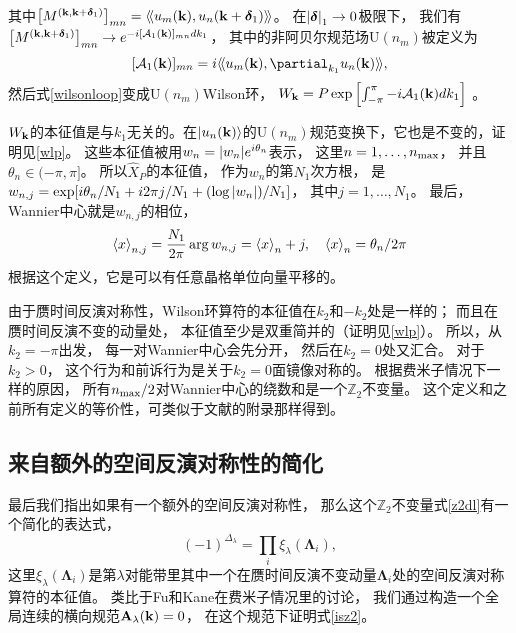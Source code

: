 其中$\bqty{M^{(\vb k,\vb k+\boldsymbol{\delta}_1)}}_{mn} =\krin{u_{m}(\vb k),u_n(\vb k+\boldsymbol{\delta}_1)}$。
在$\abs{\boldsymbol{\delta}}_1\rightarrow 0$极限下，
我们有$\bqty{M^{(\vb k,\vb k+\boldsymbol{\delta}_1)}}_{mn}\rightarrow e^{-i[\mathcal A_1(\vb k)]_{mn} dk_1}$，
其中的非阿贝尔规范场$\mathrm{U}(n_m)$被定义为
\begin{equation}\label{nonaa}
	[\mathcal A_{1}(\vb k)]_{mn}=i \krin{u_m(\vb k),\partial_{k_1} u_n(\vb k)},
\end{equation}
然后式\eqref{wilsonloop}变成$\mathrm{U}(n_m)$Wilson环，
$W_{\vb k}=P\exp\bqty{\int_{-\pi}^\pi -i\mathcal A_1(\vb k)dk_1}$ \cite{peskin1995an}。

$W_{\vb k}$的本征值是与$k_1$无关的。在$\ket{u_n(\vb k)}$的$\mathrm{U}(n_m)$规范变换下，它也是不变的，证明见\ref{wlp}。
这些本征值被用$w_n=\abs{w_n}e^{i\theta_n}$表示，
这里$n=1, \dots ,n_{\textnormal{max}}$，
并且$\theta_n\in (-\pi,\pi]$。
所以$\hat X_P$的本征值，
作为$w_n$的第$N_1$次方根，
是$w_{n,j}=\exp[i\theta_n/N_1+i 2\pi j/N_1 +(\log\abs{w_n})/N_1]$，
其中$j=1, \dots ,N_1$。
最后，
Wannier中心就是$w_{n,j}$的相位，
\begin{equation}
	\expval{x}_{n,j}=\frac{N_1}{2\pi}\arg w_{n,j}=\expval{x}_n+j,\quad \expval{x}_n=\theta_n/2\pi\nonumber
\end{equation}
根据这个定义，它是可以有任意晶格单位向量平移的。

由于赝时间反演对称性，Wilson环算符的本征值在$k_2$和$-k_2$处是一样的；
而且在赝时间反演不变的动量处，
本征值至少是双重简并的（证明见\ref{wlp}）。
所以，从$k_2=-\pi$出发，
每一对Wannier中心会先分开，
然后在$k_2=0$处又汇合。
对于$k_2>0$，
这个行为和前诉行为是关于$k_2=0$面镜像对称的。
根据费米子情况下一样的原因\cite{Yu2011}，
所有$n_{\textnormal{max}}/2$对Wannier中心的绕数和是一个$\mathbb Z_2$不变量。
这个定义和之前所有定义的等价性，可类似于文献\cite{Yu2011}的附录那样得到。


\subsection{来自额外的空间反演对称性的简化}
最后我们指出如果有一个额外的空间反演对称性，
那么这个$\mathbb Z_2$不变量式\eqref{z2dl}有一个简化的表达式，
\begin{equation}\label{isz2}
	(-1)^{\Delta_\lambda }=\prod_i \xi_\lambda (\boldsymbol{\Lambda} _i),
\end{equation}
这里$\xi_\lambda (\boldsymbol{\Lambda} _i)$是第$\lambda $对能带里其中一个在赝时间反演不变动量$\boldsymbol{\Lambda} _i$处的空间反演对称算符的本征值。
类比于Fu和Kane在费米子情况里的讨论\cite{Fu2007}，
我们通过构造一个全局连续的横向规范$\vb A_\lambda (\vb k)=0$，
在这个规范下证明式\eqref{isz2}。

